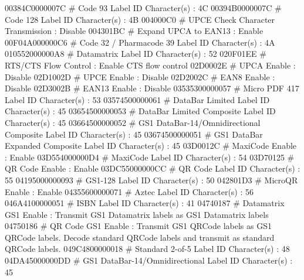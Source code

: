 00384C0000007C                 # Code 93 Label ID Character(s)            :         4C
00394B0000007C                 # Code 128 Label ID Character(s)           :         4B
004000C0                       # UPCE Check Character Transmission        :    Disable
004301BC                       # Expand UPCA to EAN13                     :     Enable
00F04A000000C6                 # Code 32 / Pharmacode 39 Label ID Character(s) :         4A
010552000000A8                 # Datamatrix Label ID Character(s)         :         52
020F01EE                       # RTS/CTS Flow Control                     : Enable CTS flow control
02D0002E                       # UPCA Enable                              :    Disable
02D1002D                       # UPCE Enable                              :    Disable
02D2002C                       # EAN8 Enable                              :    Disable
02D3002B                       # EAN13 Enable                             :    Disable
03535300000057                 # Micro PDF 417 Label ID Character(s)      :         53
03574500000061                 # DataBar Limited Label ID Character(s)    :         45
03654500000053                 # DataBar Limited Composite Label ID Character(s) :         45
03664500000052                 # GS1 DataBar-14/Omnidirectional Composite Label ID Character(s) :         45
03674500000051                 # GS1 DataBar Expanded Composite Label ID Character(s) :         45
03D0012C                       # MaxiCode Enable                          :     Enable
03D554000000D4                 # MaxiCode Label ID Character(s)           :         54
03D70125                       # QR Code Enable                           :     Enable
03DC55000000CC                 # QR Code Label ID Character(s)            :         55
04195000000093                 # GS1-128 Label ID Character(s)            :         50
042801D3                       # MicroQR Enable                           :     Enable
04355600000071                 # Aztec Label ID Character(s)              :         56
046A4100000051                 # ISBN Label ID Character(s)               :         41
04740187                       # Datamatrix GS1 Enable                    : Transmit GS1 Datamatrix labels as GS1 Datamatrix labels
04750186                       # QR Code GS1 Enable                       : Transmit GS1 QRCode labels as GS1 QRCode labels. Decode standard QRCode labels and transmit as standard QRCode labels.
049C4800000018                 # Standard 2-of-5 Label ID Character(s)    :         48
04DA45000000DD                 # GS1 DataBar-14/Omnidirectional Label ID Character(s) :         45
